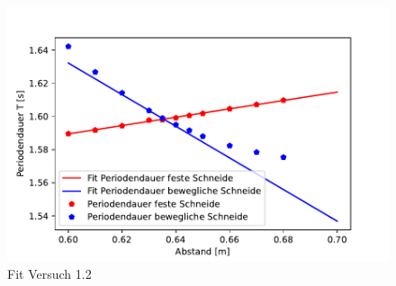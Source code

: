 \begin{figure}[ht]
    \centering
    \includegraphics[scale=0.8]{Pendel/Protokoll/fig/Pendel Versuch 1.2 Fit.pdf}
    \caption{Fit Versuch 1.2}
    \label{fig:Pendel Versuch 1.1 Fit}
\end{figure}